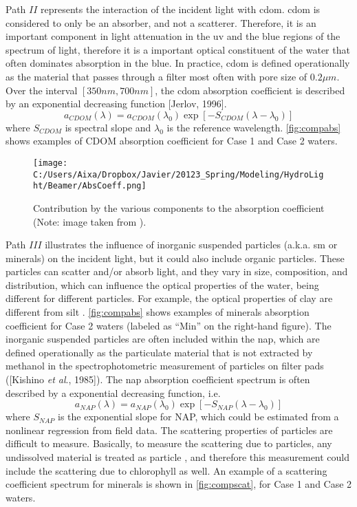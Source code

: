 Path $II$ represents the interaction of the incident light with \gls{cdom}. \gls{cdom} is considered to only be an absorber, and not a scatterer. Therefore, it is an important component in light attenuation in the \gls{uv} and the blue regions of the spectrum of light, therefore it is a important optical constituent of the water that often dominates absorption in the blue. In practice, \gls{cdom} is defined operationally as the material that passes through a filter most often with pore size of $0.2\mu m$. Over the interval $[350nm,700nm]$, the \gls{cdom} absorption coefficient is described by an exponential decreasing function [Jerlov, 1996].
\begin{equation}
  a_{CDOM}(\lambda) = a_{CDOM}(\lambda_0)\exp{\left[-S_{CDOM}(\lambda-\lambda_0)\right]}
\end{equation}
where $S_{CDOM}$ is spectral slope and $\lambda_0$ is the reference wavelength. \autoref{fig:compabs} shows examples of CDOM absorption coefficient for Case 1 and Case 2 waters.

\begin{figure}[htb]
\centering
      \texttt{[image: C:/Users/Aixa/Dropbox/Javier/20123\_Spring/Modeling/HydroLight/Beamer/AbsCoeff.png]}
      \caption{Contribution by the various components to the absorption coefficient (Note: image taken from \cite{Mobley:2001}).}
      \label{fig:compabs}
\end{figure}

Path $III$ illustrates the influence of inorganic suspended particles (a.k.a. \gls{sm} or minerals) on the incident light, but it could also include organic particles. These particles can scatter and/or absorb light, and they vary in size, composition, and distribution, which can influence the optical properties of the water, being different for different particles. For example, the optical properties of clay are different from silt \cite{Pahlevan:2012}. \autoref{fig:compabs} shows examples of minerals absorption coefficient for Case 2 waters (labeled as ``Min'' on the right-hand figure). The inorganic suspended particles are often included within the \gls{nap}, which are defined operationally as the particulate material that is not extracted by methanol in the spectrophotometric measurement of particles on filter pads ([Kishino {\it et al}., 1985]). The \gls{nap} absorption coefficient spectrum is often described by a exponential decreasing function, i.e.
\begin{equation}
  a_{NAP}(\lambda) = a_{NAP}(\lambda_0)\exp{\left[-S_{NAP}(\lambda-\lambda_0)\right]}
\end{equation}
where $S_{NAP}$ is the exponential slope for NAP, which could be estimated from a nonlinear regression from field data. The scattering properties of particles are difficult to measure. Basically, to measure the scattering due to particles, any undissolved material is treated as particle \cite{GeraceThesis}, and therefore this measurement could include the scattering due to chlorophyll as well. An example of a scattering coefficient spectrum for minerals is shown in \autoref{fig:compscat}, for Case 1 and Case 2 waters.


